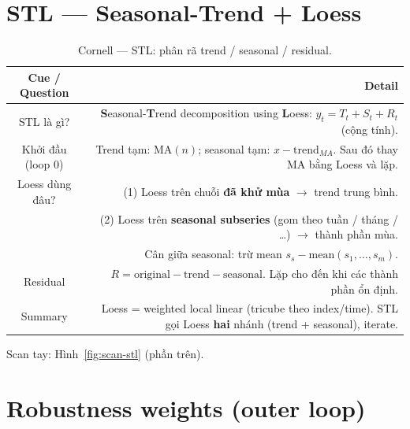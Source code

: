 \documentclass[12pt,a4paper]{article}
\newcommand{\cornellhead}{%
  \toprule
  \textbf{Cue / Question} & \textbf{Detail} \\
  \midrule
}
\begin{document}
\section{STL --- Seasonal-Trend + Loess}

\begin{table}[H]
  \centering
  \caption{Cornell --- STL: phân rã trend / seasonal / residual.}
  \label{tab:cornell-stl}
  \small
  \begin{tabularx}{\textwidth}{@{}CD@{}}
    \cornellhead
    STL là gì? &
    \textbf{S}easonal-\textbf{T}rend decomposition using \textbf{L}oess:
    \(y_t = T_t + S_t + R_t\) (cộng tính). \\
    \addlinespace
    Khởi đầu (loop 0) &
    Trend tạm: \(\mathrm{MA}(n)\);
    seasonal tạm: \(x - \mathrm{trend}_{MA}\).
    Sau đó thay MA bằng Loess và lặp. \\
    \addlinespace
    Loess dùng đâu? &
    (1) Loess trên chuỗi \textbf{đã khử mùa} $\to$ trend trung bình. \\
                        & (2) Loess trên \textbf{seasonal subseries}
    (gom theo tuần / tháng / \ldots) $\to$ thành phần mùa. \\
                        & Cân giữa seasonal: trừ mean
    \(s_s - \mathrm{mean}(s_1,\ldots,s_m)\). \\
    \addlinespace
    Residual            &
    \(R = \mathrm{original} - \mathrm{trend} - \mathrm{seasonal}\).
    Lặp cho đến khi các thành phần ổn định. \\
    \addlinespace
    Summary             &
    Loess = weighted local linear (tricube theo index/time).
    STL gọi Loess \textbf{hai} nhánh (trend + seasonal), iterate. \\
    \bottomrule
  \end{tabularx}
\end{table}

\noindent Scan tay: Hình~\ref{fig:scan-stl} (phần trên).

\section{Robustness weights (outer loop)}
\end{document}
